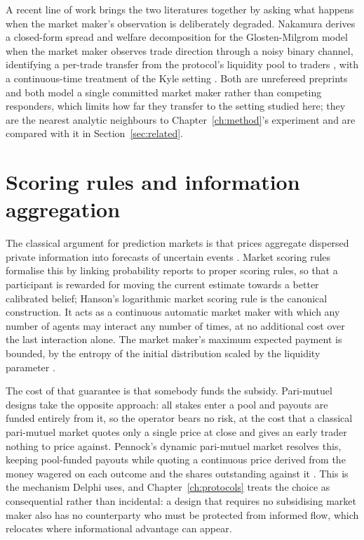 A recent line of work brings the two literatures together by asking what happens when the
market maker's observation is deliberately degraded. Nakamura derives a closed-form spread
and welfare decomposition for the Glosten-Milgrom model when the market maker observes trade
direction through a noisy binary channel, identifying a per-trade transfer from the
protocol's liquidity pool to traders \cite{nakamura2026privacysubsidy}, with a
continuous-time treatment of the Kyle setting \cite{nakamura2026kyle}. Both are unrefereed
preprints and both model a single committed market maker rather than competing responders,
which limits how far they transfer to the setting studied here; they are the nearest
analytic neighbours to Chapter~\ref{ch:method}'s experiment and are compared with it in
Section~\ref{sec:related}.

\section{Scoring rules and information aggregation}
\label{sec:bg-scoring}

The classical argument for prediction markets is that prices aggregate dispersed private
information into forecasts of uncertain events \cite{wolfers2004prediction}. Market scoring
rules formalise this by linking probability reports to proper scoring rules, so that a
participant is rewarded for moving the current estimate towards a better calibrated belief;
Hanson's logarithmic market scoring rule is the canonical construction. It acts as a
continuous automatic market maker with which any number of agents may interact any number of
times, at no additional cost over the last interaction alone. The market maker's maximum
expected payment is bounded, by the entropy of the initial distribution scaled by the
liquidity parameter \cite{hanson2007lmsr}.

The cost of that guarantee is that somebody funds the subsidy. Pari-mutuel designs take the
opposite approach: all stakes enter a pool and payouts are funded entirely from it, so the
operator bears no risk, at the cost that a classical pari-mutuel market quotes only a single
price at close and gives an early trader nothing to price against. Pennock's dynamic
pari-mutuel market resolves this, keeping pool-funded payouts while quoting a continuous
price derived from the money wagered on each outcome and the shares outstanding against it
\cite{pennock2004dpm}. This is the
mechanism Delphi uses, and Chapter~\ref{ch:protocols} treats the choice as consequential
rather than incidental: a design that requires no subsidising market maker also has no
counterparty who must be protected from informed flow, which relocates where informational
advantage can appear.

